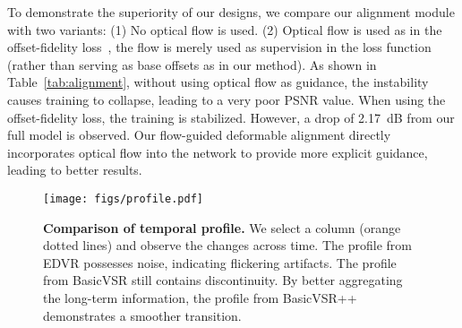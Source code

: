 \documentclass[10pt,twocolumn,letterpaper]{article}
\begin{document}
To demonstrate the superiority of our designs, we compare our alignment module with two variants: (1) No optical flow is used. (2) Optical flow is used as in the offset-fidelity loss~\cite{chan2021understanding}, \ie the flow is merely used as supervision in the loss function (rather than serving as base offsets as in our method). As shown in Table~\ref{tab:alignment}, without using optical flow as guidance, the instability causes training to collapse, leading to a very poor PSNR value.
When using the offset-fidelity loss, the training is stabilized. However, a drop of 2.17~dB from our full model is observed. Our flow-guided deformable alignment directly incorporates optical flow into the network to provide more explicit guidance, leading to better results.
\begin{table}[t]
    \caption{\textbf{Comparison of alignment modules.} Using optical flow to guide deformable alignment successfully stabilizes training. BasicVSR++ directly incorporates optical flow into the network, outperforming the offset-fidelity loss~\cite{chan2021understanding}.}
    \vspace{-0.3cm}
    \label{tab:alignment}
    \begin{center}
        \tabcolsep=0.15cm
    \end{center}
    \vspace{-0.5cm}
\end{table}
\begin{figure}[t]
    \begin{center}
        \texttt{[image: figs/profile.pdf]}
        \vspace{-0.7cm}
        \caption{\textbf{Comparison of temporal profile.} We select a column (orange dotted lines) and observe the changes across time. The profile from EDVR possesses noise, indicating flickering artifacts. The profile from BasicVSR still contains discontinuity. By better aggregating the long-term information, the profile from BasicVSR++ demonstrates a smoother transition.}
        \label{fig:profile}
    \end{center}
    \vspace{-0.7cm}
\end{figure}
\end{document}
